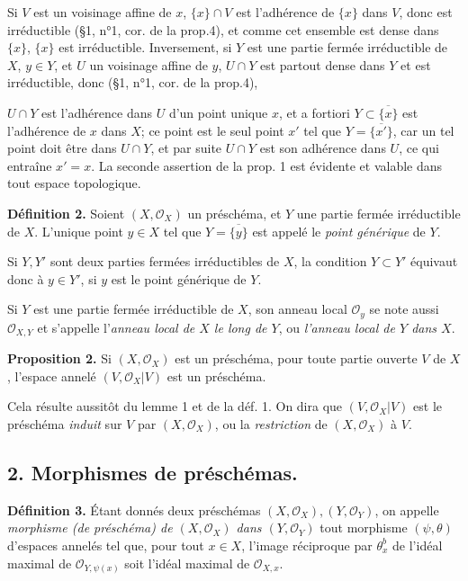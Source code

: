 Si $V$ est un voisinage affine de $x$, $\{x\} \cap V$ est l'adhérence de $\{x\}$ dans $V$, donc est irréductible (§1, n°1, cor. de la prop.4), et comme cet ensemble est dense dans $\{x\}$, $\{x\}$ est irréductible. Inversement, si $Y$ est une partie fermée irréductible de $X$, $y \in Y$, et $U$ un voisinage affine de $y$, $U \cap Y$ est partout dense dans $Y$ et est irréductible, donc (§1, n°1, cor. de la prop.4),

\newpage


$U \cap Y$ est l'adhérence dans $U$ d'un point unique $x$, et a fortiori $Y \subset \overline{\{x\}}$ est l'adhérence de $x$ dans $X$; ce point est le seul point $x'$ tel que $Y = \overline{\{x'\}}$, car un tel point doit être dans $U \cap Y$, et par suite $U \cap Y$ est son adhérence dans $U$, ce qui entraîne $x' = x$. La seconde assertion de la prop. 1 est évidente et valable dans tout espace topologique.

\textbf{Définition 2.} Soient $(X, \mathcal{O}_X)$ un préschéma, et $Y$ une partie fermée irréductible de $X$. L'unique point $y \in X$ tel que $Y = \overline{\{y\}}$ est appelé le \emph{point générique} de $Y$.

Si $Y, Y'$ sont deux parties fermées irréductibles de $X$, la condition $Y \subset Y'$ équivaut donc à $y \in Y'$, si $y$ est le point générique de $Y$.

Si $Y$ est une partie fermée irréductible de $X$, son anneau local $\mathcal{O}_y$ se note aussi $\mathcal{O}_{X,Y}$ et s'appelle l'\emph{anneau local de $X$ le long de $Y$}, ou \emph{l'anneau local de $Y$ dans $X$}.

\textbf{Proposition 2.} Si $(X, \mathcal{O}_X)$ est un préschéma, pour toute partie ouverte $V$ de $X$, l'espace annelé $(V, \mathcal{O}_X|V)$ est un préschéma.

Cela résulte aussitôt du lemme 1 et de la déf. 1. On dira que $(V, \mathcal{O}_X|V)$ est le préschéma \emph{induit} sur $V$ par $(X, \mathcal{O}_X)$, ou la \emph{restriction} de $(X, \mathcal{O}_X)$ à $V$.

\subsection*{2. Morphismes de préschémas.}

\textbf{Définition 3.} Étant donnés deux préschémas $(X, \mathcal{O}_X), (Y, \mathcal{O}_Y)$, on appelle \emph{morphisme (de préschéma) de $(X, \mathcal{O}_X)$ dans $(Y, \mathcal{O}_Y)$} tout morphisme $(\psi, \theta)$ d'espaces annelés tel que, pour tout $x \in X$, l'image réciproque par $\theta_x^b$ de l'idéal maximal de $\mathcal{O}_{Y, \psi(x)}$ soit l'idéal maximal de $\mathcal{O}_{X,x}$.

